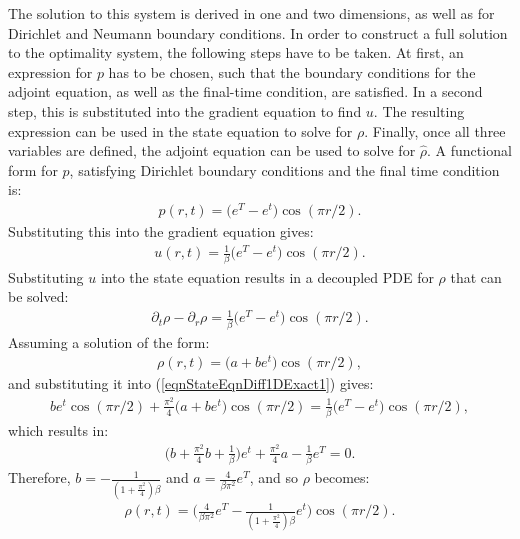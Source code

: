 The solution to this system is derived in one and two dimensions, as well as for Dirichlet and Neumann boundary conditions.
\newline
\newline
In order to construct a full solution to the optimality system, the following steps have to be taken. At first, an expression for $p$ has to be chosen, such that the boundary conditions for the adjoint equation, as well as the final-time condition, are satisfied.
In a second step, this is substituted into the gradient equation to find $u$. The resulting expression can be used in the state equation to solve for $\rho$. Finally, once all three variables are defined, the adjoint equation can be used to solve for $\hat \rho$.
A functional form for $p$, satisfying Dirichlet boundary conditions and the final time condition is:
\begin{align*}
p(r,t) = \bigg( e^T -e^t \bigg) \cos(\pi r /2).
\end{align*}
Substituting this into the gradient equation gives:
\begin{align*}
u(r,t) = \frac{1}{\beta}\bigg( e^T -e^t \bigg) \cos(\pi r /2).
\end{align*}
Substituting $u$ into the state equation results in a decoupled PDE for $\rho$ that can be solved:
\begin{align}\label{eqnStateEqnDiff1DExact1}
\partial_t \rho - \partial_{r} \rho=\frac{1}{\beta}\bigg( e^T -e^t \bigg) \cos(\pi r /2).
\end{align}
Assuming a solution of the form: 
\begin{align*}
\rho(r,t)= \bigg(a +be^t\bigg)\cos(\pi r /2),
\end{align*}
and substituting it into (\ref{eqnStateEqnDiff1DExact1}) gives:
\begin{align*}
be^t\cos(\pi r /2) + \frac{\pi^2}{4}\bigg(a +be^t\bigg)\cos(\pi r /2)=\frac{1}{\beta}\bigg( e^T -e^t \bigg) \cos(\pi r /2),
\end{align*}
which results in:
\begin{align*}
\bigg(b+\frac{\pi^2}{4}b + \frac{1}{\beta} \bigg)e^t + \frac{\pi^2}{4}a-\frac{1}{\beta} e^T  =0.
\end{align*}
Therefore, $\displaystyle b=-\frac{1}{(1+\frac{\pi^2}{4}) \beta}$ and $ \displaystyle a=\frac{4}{\beta \pi^2}e^T$, and so $\rho$ becomes:
\begin{align*}
\rho(r,t)= \bigg(\frac{4}{\beta \pi^2}e^T -\frac{1}{(1+\frac{\pi^2}{4}) \beta}e^t\bigg)\cos(\pi r /2).
\end{align*}

